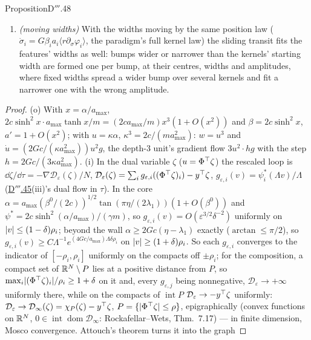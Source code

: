 \begin{thm}{Proposition}{D$'''$.48}
\begin{enumerate}[label=\textup{(\roman*)}]
    than under the paradigm's metric.
  \item \emph{(moving widths)} With the widths moving by the same position law
    ($\dot\sigma_i = G\beta_ia_i\langle r\partial_\sigma\varphi_i\rangle$, the paradigm's full kernel law) the sliding
    transit fits the features' widths as well: bumps wider or narrower than the kernels' starting width are formed one
    per bump, at their centres, widths and amplitudes, where fixed widths spread a wider bump over several kernels and
    fit a narrower one with the wrong amplitude.
\end{enumerate}
\end{thm}

\begin{proof}
(o) With $x = \alpha/a_{\max}$, $2c\sinh^2x\cdot a_{\max}\tanh x/m = (2ca_{\max}/m)x^3(1 + O(x^2))$ and
$\beta = 2c\sinh^2x$, $a' = 1 + O(x^2)$; with $u = \kappa\alpha$, $\kappa^3 = 2c/(ma_{\max}^2)$: $w = u^3$ and
$\dot u = (2Gc/(\kappa a_{\max}^2))u^2g$, the depth-3 unit's gradient flow $3u^2\cdot hg$ with the step
$h = 2Gc/(3\kappa a_{\max}^2)$. (i) In the dual variable $\zeta$ ($u = \Phi^\top\zeta$) the rescaled loop is
$\dd\zeta/\dd\tau = -\nabla\mathcal D_\varepsilon(\zeta)/N$,
$\mathcal D_\varepsilon(\zeta) = \sum_ig_{\varepsilon,i}((\Phi^\top\zeta)_i) - y^\top\zeta$,
$g_{\varepsilon,i}(v) = \psi^*_i(\Lambda v)/\Lambda$ (\hyperref[res:thmDppp:45]{D$'''$.45}(iii)'s dual flow in $\tau$). In
the core $\alpha = a_{\max}(\beta^0/(2c))^{1/2}\tan(\pi\eta/(2\lambda_1))(1 + O(\beta^0))$ and
$\psi^* = 2c\sinh^2(\alpha/a_{\max})/(\gamma m)$, so $g_{\varepsilon,i}(v) = O(\varepsilon^{3/2}\delta^{-2})$ uniformly
on $\lvert v\rvert\le(1 - \delta)\rho_i$; beyond the wall $\alpha\ge2Gc(\eta - \lambda_1)$ exactly ($\arctan\le\pi/2$), so
$g_{\varepsilon,i}(v)\ge C\Lambda^{-1}e^{(4Gc/a_{\max})\Lambda\delta\rho_i}$ on $\lvert v\rvert\ge(1 + \delta)\rho_i$. So each
$g_{\varepsilon,i}$ converges to the indicator of $[-\rho_i,\rho_i]$ uniformly on the compacts off $\pm\rho_i$; for the
composition, a compact set of $\mathbb{R}^N\setminus P$ lies at a positive distance from $P$, so
$\max_i\lvert (\Phi^\top\zeta)_i\rvert/\rho_i\ge1 + \delta$ on it and, every $g_{\varepsilon,j}$ being nonnegative,
$\mathcal D_\varepsilon\to+\infty$ uniformly there, while on the compacts of $\operatorname{int}P$
$\mathcal D_\varepsilon\to-y^\top\zeta$ uniformly:
$\mathcal D_\varepsilon\to\mathcal D_\infty(\zeta) = \chi_P(\zeta) - y^\top\zeta$, $P = \{\lvert \Phi^\top\zeta\rvert\le\rho\}$,
epigraphically (convex functions on $\mathbb{R}^N$, $0\in\operatorname{int}\operatorname{dom}\mathcal D_\infty$:
Rockafellar--Wets, Thm.~7.17) --- in finite dimension, Mosco convergence. Attouch's theorem turns it into the graph

\end{proof}
